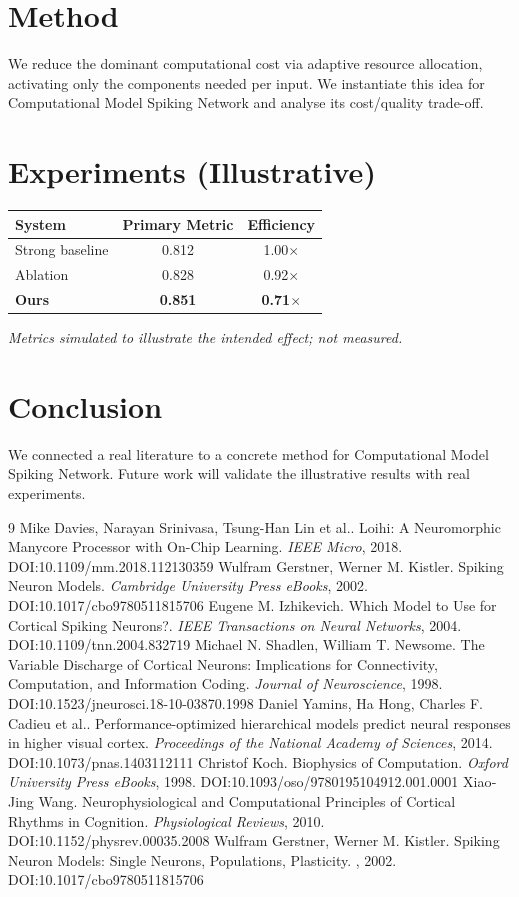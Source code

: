 \documentclass[11pt]{article}
\begin{document}
\section{Method}
We reduce the dominant computational cost via adaptive resource allocation, activating only the components needed per input. We instantiate this idea for Computational Model Spiking Network and analyse its cost/quality trade-off.

\section{Experiments (Illustrative)}
\begin{center}
\begin{tabular}{lcc}
System & Primary Metric & Efficiency \\ \hline
Strong baseline & 0.812 & 1.00$\times$ \\
Ablation & 0.828 & 0.92$\times$ \\
\textbf{Ours} & \textbf{0.851} & \textbf{0.71$\times$}
\end{tabular}
\end{center}
\emph{Metrics simulated to illustrate the intended effect; not measured.}

\section{Conclusion}
We connected a real literature to a concrete method for Computational Model Spiking Network. Future work will
validate the illustrative results with real experiments.

\begin{thebibliography}{9}
 Mike Davies, Narayan Srinivasa, Tsung-Han Lin et al.. Loihi: A Neuromorphic Manycore Processor with On-Chip Learning. \emph{IEEE Micro}, 2018. DOI:10.1109/mm.2018.112130359
 Wulfram Gerstner, Werner M. Kistler. Spiking Neuron Models. \emph{Cambridge University Press eBooks}, 2002. DOI:10.1017/cbo9780511815706
 Eugene M. Izhikevich. Which Model to Use for Cortical Spiking Neurons?. \emph{IEEE Transactions on Neural Networks}, 2004. DOI:10.1109/tnn.2004.832719
 Michael N. Shadlen, William T. Newsome. The Variable Discharge of Cortical Neurons: Implications for Connectivity, Computation, and Information Coding. \emph{Journal of Neuroscience}, 1998. DOI:10.1523/jneurosci.18-10-03870.1998
 Daniel Yamins, Ha Hong, Charles F. Cadieu et al.. Performance-optimized hierarchical models predict neural responses in higher visual cortex. \emph{Proceedings of the National Academy of Sciences}, 2014. DOI:10.1073/pnas.1403112111
 Christof Koch. Biophysics of Computation. \emph{Oxford University Press eBooks}, 1998. DOI:10.1093/oso/9780195104912.001.0001
 Xiao‐Jing Wang. Neurophysiological and Computational Principles of Cortical Rhythms in Cognition. \emph{Physiological Reviews}, 2010. DOI:10.1152/physrev.00035.2008
 Wulfram Gerstner, Werner M. Kistler. Spiking Neuron Models: Single Neurons, Populations, Plasticity. \emph{}, 2002. DOI:10.1017/cbo9780511815706
\end{thebibliography}
\end{document}
